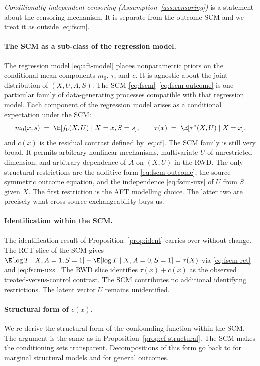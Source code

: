 \emph{Conditionally independent censoring (Assumption~\ref{ass:censoring})} is a statement about the censoring mechanism.
It is separate from the outcome SCM and we treat it as outside \eqref{eq:fscm}.

\paragraph{The SCM as a sub-class of the regression model.}
The regression model \eqref{eq:aft-model} places nonparametric priors on the conditional-mean components $m_0$, $\tau$, and $c$.
It is agnostic about the joint distribution of $(X, U, A, S)$.
The SCM \eqref{eq:fscm}--\eqref{eq:fscm-outcome} is one particular family of data-generating processes compatible with that regression model.
Each component of the regression model arises as a conditional expectation under the SCM:
\begin{equation}
m_0(x, s) \;=\; \E[f_0(X, U) \mid X = x, S = s], \qquad \tau(x) \;=\; \E[\tau^*(X, U) \mid X = x],
\label{eq:fscm-induced}
\end{equation}
and $c(x)$ is the residual contrast defined by \eqref{eq:cf}.
The SCM family is still very broad.
It permits arbitrary nonlinear mechanisms, multivariate $U$ of unrestricted dimension, and arbitrary dependence of $A$ on $(X, U)$ in the RWD.
The only structural restrictions are the additive form \eqref{eq:fscm-outcome}, the source-symmetric outcome equation, and the independence \eqref{eq:fscm-uxs} of $U$ from $S$ given $X$.
The first restriction is the AFT modelling choice.
The latter two are precisely what cross-source exchangeability buys us.

\paragraph{Identification within the SCM.}
The identification result of Proposition~\ref{prop:ident} carries over without change.
The RCT slice of the SCM gives $\E[\log T \mid X, A = 1, S = 1] - \E[\log T \mid X, A = 0, S = 1] = \tau(X)$ via \eqref{eq:fscm-rct} and \eqref{eq:fscm-uxs}.
The RWD slice identifies $\tau(x) + c(x)$ as the observed treated-versus-control contrast.
The SCM contributes no additional identifying restrictions.
The latent vector $U$ remains unidentified.

\paragraph{Structural form of $c(x)$.}
We re-derive the structural form of the confounding function within the SCM.
The argument is the same as in Proposition~\ref{prop:cf-structural}.
The SCM makes the conditioning sets transparent.
Decompositions of this form go back to \citet{brumback2004sensitivity} for marginal structural models and \citet{vanderweele2011bias} for general outcomes.


